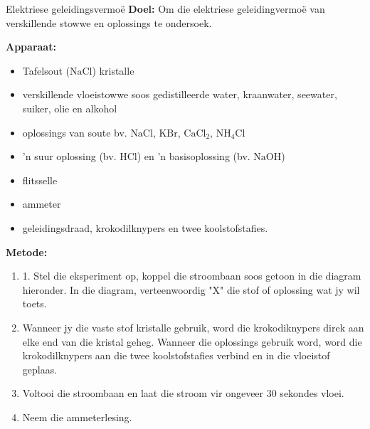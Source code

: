             \begin{g_experiment}{Elektriese geleidingsvermo\"{e}}
            \nopagebreak
            \label{m38720*id339425}\noindent{}\textbf{Doel:}
          \newline
Om die elektriese geleidingvermo\"{e} van verskillende stowwe en oplossings te ondersoek.\par 
        \label{m38720*id339438}\noindent{}\textbf{Apparaat:}
\begin{itemize}[noitemsep]
\item Tafelsout ($\text{NaCl}$) kristalle
\item verskillende vloeistowwe soos gedistilleerde water, kraanwater, seewater, suiker, olie en alkohol
\item oplossings van soute bv. $\text{NaCl}$, $\text{KBr}$, $\text{CaCl}_{2}$, $\text{NH}_{4}\text{Cl}$
\item  'n suur oplossing (bv. $\text{HCl}$) en  'n basisoplossing (bv. $\text{NaOH}$)
\item flitsselle
\item ammeter
\item geleidingsdraad, krokodilknypers en twee koolstofstafies.
\end{itemize}
        \label{m38720*eip-456}
	\par
      \label{m38720*id334346}\noindent{}\textbf{Metode:}
\begin{enumerate}[noitemsep, label=\textbf{\arabic*}.]
\item 1. Stel die eksperiment op, koppel die stroombaan soos getoon in die diagram hieronder. In die diagram, verteenwoordig "X" die stof of oplossing wat jy wil toets.
\item Wanneer jy die vaste stof kristalle gebruik, word die krokodiknypers direk aan elke end van die kristal geheg.  Wanneer die oplossings gebruik word, word die krokodilknypers aan die twee koolstofstafies verbind en in die vloeistof geplaas. 
\item Voltooi die stroombaan en laat die stroom vir ongeveer 30 sekondes vloei. 
\item Neem die ammeterlesing.
\end{enumerate}
        \label{m38720*id334362}
\begin{minipage}{.5\textwidth}
    \setcounter{subfigure}{0}
	\begin{figure}[H] %
\begin{center}
\end{center}
\end{figure}
\end{minipage}
\end{g_experiment}
